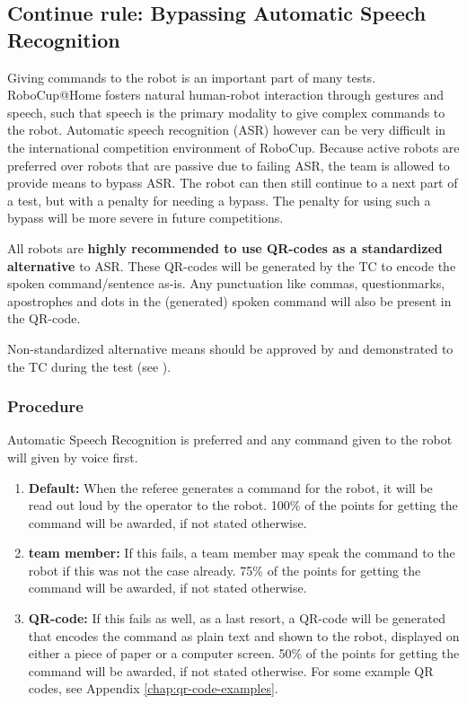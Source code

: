 \subsection{Continue rule: Bypassing Automatic Speech Recognition}
\label{rule:asrcontinue}

Giving commands to the robot is an important part of many tests. 
RoboCup@Home fosters natural human-robot interaction through gestures and speech, such that speech is the primary modality to give complex commands to the robot. 
Automatic speech recognition (ASR) however can be very difficult in the international competition environment of RoboCup. 
Because active robots are preferred over robots that are passive due to failing ASR, 
  the team is allowed to provide means to bypass ASR. 
The robot can then still continue to a next part of a test, but with a penalty for needing a bypass. 
The penalty for using such a bypass will be more severe in future competitions.

All robots are \textbf{highly recommended to use QR-codes as a standardized alternative} to ASR. These QR-codes will be generated by the TC to encode the spoken command/sentence as-is. 
Any punctuation like commas, questionmarks, apostrophes and dots in the (generated) spoken command will also be present in the QR-code. 

Non-standardized alternative means should be
  approved by and demonstrated to the TC during the  test (see ).

\subsubsection{Procedure}
Automatic Speech Recognition is preferred and any command given to the robot will given by voice first.
\begin{enumerate}
\item \textbf{Default:} When the referee generates a command for the robot, it will be read out loud by the operator to the robot. 100\% of the points for getting the command will be awarded, if not stated otherwise.
\item \textbf{team member: } If this fails, a team member may speak the command to the robot if this was not the case already.  75\% of the points for getting the command will be awarded, if not stated otherwise.
\item \textbf{QR-code:} If this fails as well, as a last resort, a QR-code will be generated that encodes the command as plain text and shown to the robot, displayed on either a piece of paper or a computer screen. 50\% of the points for getting the command will be awarded, if not stated otherwise.
      For some example QR codes, see Appendix \ref{chap:qr-code-examples}.
\end{enumerate}

